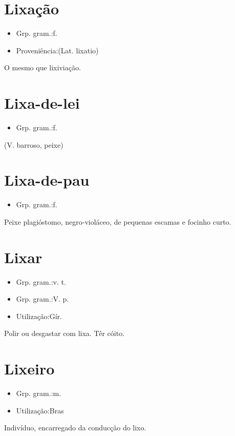 \section{Lixação}
\begin{itemize}
\item {Grp. gram.:f.}
\end{itemize}
\begin{itemize}
\item {Proveniência:(Lat. \textunderscore lixatio\textunderscore )}
\end{itemize}
O mesmo que \textunderscore lixiviação\textunderscore .
\section{Lixa-de-lei}
\begin{itemize}
\item {Grp. gram.:f.}
\end{itemize}
(V. \textunderscore barroso\textunderscore , peixe)
\section{Lixa-de-pau}
\begin{itemize}
\item {Grp. gram.:f.}
\end{itemize}
Peixe plagióstomo, negro-violáceo, de pequenas escamas e focinho curto.
\section{Lixar}
\begin{itemize}
\item {Grp. gram.:v. t.}
\end{itemize}
\begin{itemize}
\item {Grp. gram.:V. p.}
\end{itemize}
\begin{itemize}
\item {Utilização:Gír.}
\end{itemize}
Polir ou desgastar com lixa.
Têr cóito.
\section{Lixeiro}
\begin{itemize}
\item {Grp. gram.:m.}
\end{itemize}
\begin{itemize}
\item {Utilização:Bras}
\end{itemize}
Indivíduo, encarregado da conducção do lixo.
